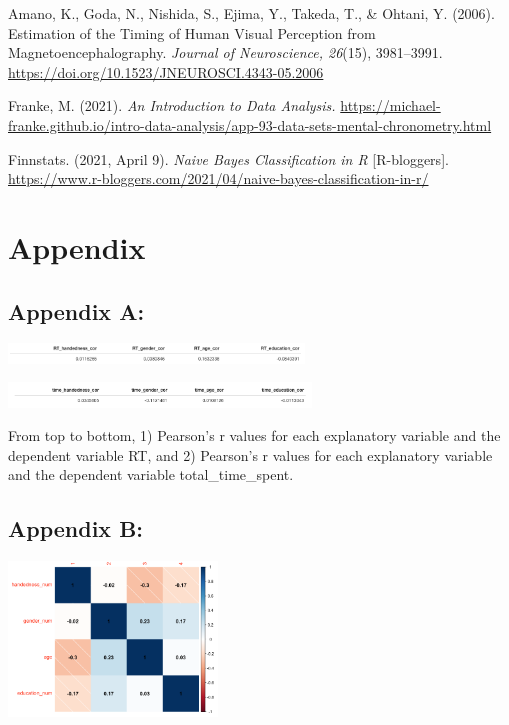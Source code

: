 \documentclass[
]{article}
\begin{document}
Amano, K., Goda, N., Nishida, S., Ejima, Y., Takeda, T., \& Ohtani, Y.
(2006). Estimation of the Timing of Human Visual Perception from
Magnetoencephalography. \emph{Journal of Neuroscience, 26}(15),
3981--3991. \url{https://doi.org/10.1523/JNEUROSCI.4343-05.2006}

Franke, M. (2021). \emph{An Introduction to Data Analysis.}
\url{https://michael-franke.github.io/intro-data-analysis/app-93-data-sets-mental-chronometry.html}

Finnstats. (2021, April 9). \emph{Naive Bayes Classification in R}
{[}R-bloggers{]}.
\url{https://www.r-bloggers.com/2021/04/naive-bayes-classification-in-r/}

\newpage

\hypertarget{appendix}{%
\section{Appendix}\label{appendix}}

\hypertarget{appendix-a}{%
\subsection{Appendix A:}\label{appendix-a}}

\begin{center}\includegraphics[width=3.09in]{Methodology_RT_cor} \end{center}

\begin{center}\includegraphics[width=3.17in]{Methodology_time_cor} \end{center}

From top to bottom, 1) Pearson's r values for each explanatory variable
and the dependent variable RT, and 2) Pearson's r values for each
explanatory variable and the dependent variable total\_time\_spent.

\hypertarget{appendix-b}{%
\subsection{Appendix B:}\label{appendix-b}}

\begin{center}\includegraphics[width=2.19in]{Methodology_cor_matrix} \end{center}
\end{document}
